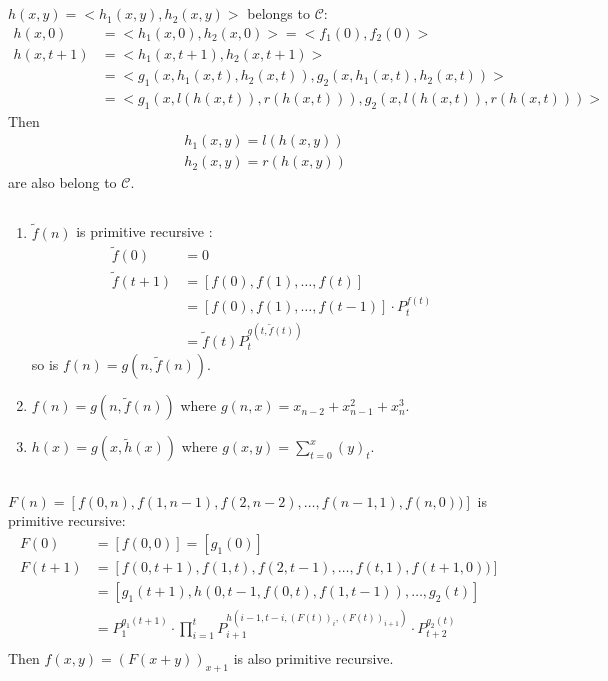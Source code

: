\subsection{}
$ h(x,y) = <h_1(x,y), h_2(x,y)> $ belongs to $\mathscr{C}$:
\begin{align*}
  h(x,0)   & = <h_1(x,0), h_2(x,0)> = <f_1(0),f_2(0)> \\
  h(x,t+1) & = <h_1(x,t+1), h_2(x,t+1)> \\
           & = <g_1(x,h_1(x,t), h_2(x,t)), g_2(x,h_1(x,t), h_2(x,t))> \\
           & = <g_1(x,l(h(x,t)), r(h(x,t))), g_2(x,l(h(x,t)), r(h(x,t)))> 
\end{align*}
Then 
\begin{align*}
  & h_1(x,y) = l(h(x,y)) \\
  & h_2(x,y) = r(h(x,y))
\end{align*}
are also belong to $\mathscr{C}$.


\subsection{}
\begin{enumerate}
  \item 
  $ \tilde f(n) $ is primitive recursive :
  \begin{align*}
    \tilde f(0)   & = 0 \\
    \tilde f(t+1) & = [f(0),f(1),\dots ,f(t)] \\
             & = [f(0),f(1),\dots ,f(t-1)]\cdot P_{t}^{f(t)} \\
             & = \tilde f(t)P_{t}^{g(t,\tilde f(t))} 
  \end{align*}
  so is $ f(n) = g(n, \tilde f(n)) $.
  
  \item 
  $ f(n) = g(n, \tilde f(n)) $ where $ g(n,x) = x_{n-2}+x_{n-1}^2+x_{n}^3 $.
  
  \item 
  $ h(x) = g(x, \tilde h(x)) $ where $ g(x,y) = \sum_{t=0}^x{(y)_{t}} $.
\end{enumerate}


\subsection{}
$ F(n) = [f(0,n),f(1,n-1),f(2,n-2),\dots ,f(n-1,1),f(n,0))] $ is primitive recursive:
\begin{align*}
  F(0)   & = [f(0,0)] = [g_1(0)] \\
  F(t+1) & = [f(0,t+1),f(1,t),f(2,t-1),\dots ,f(t,1),f(t+1,0))] \\
         & = [g_1(t+1),h(0,t-1,f(0,t),f(1,t-1)),\dots ,g_2(t)] \\
         & = P_1^{g_1(t+1)}\cdot \prod_{i=1}^t{P_{i+1}^{h(i-1,t-i,(F(t))_i,(F(t))_{i+1})}} \cdot P_{t+2}^{g_2(t)} \\
\end{align*}
Then $ f(x,y) = (F(x+y))_{x+1} $ is also primitive recursive.